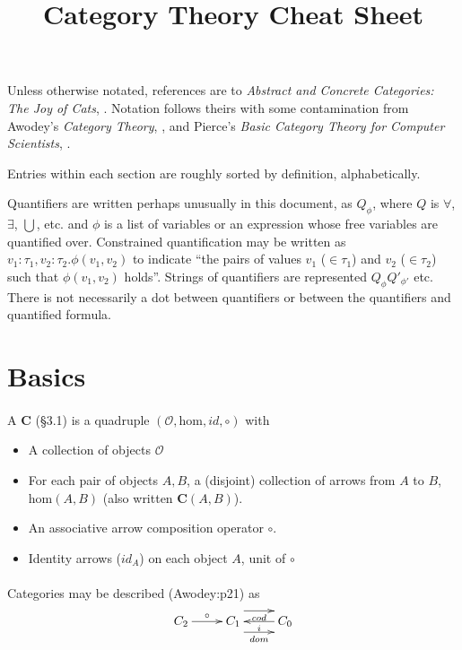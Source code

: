 \documentclass[10pt,twocolumn,letterpaper]{article}
\title{Category Theory Cheat Sheet}
\begin{document}
Unless otherwise notated, references are to \textit{Abstract and Concrete
Categories: The Joy of Cats}, \cite{adamek:joy}.  Notation follows theirs
with some contamination from Awodey's \textit{Category Theory},
\cite{awodey:ct}, and Pierce's \textit{Basic Category Theory for Computer
Scientists}, \cite{pierce:basicct}.

Entries within each section are roughly sorted by definition, alphabetically.

Quantifiers are written perhaps unusually in this document, as $Q_{\phi}$,
where $Q$ is $\forall$, $\exists$, $\bigcup$, etc. and $\phi$ is a list of
variables or an expression whose free variables are quantified over.
Constrained quantification may be written as $v_1 : \tau_1, v_2 : \tau_2 .
\phi(v_1,v_2)$ to indicate ``the pairs of values $v_1$ ($\in \tau_1$) and
$v_2$ ($\in \tau_2$) such that $\phi(v_1,v_2)$ holds''.  Strings of
quantifiers are represented $Q_{\phi} Q'_{\phi'}$ etc.  There is not
necessarily a dot between quantifiers or between the quantifiers and
quantified formula.

\section{Basics} %

  \paragraph{}
  A  $\mathbf{C}$ (\S3.1) is a quadruple
  $(\mathcal{O},\mbox{hom},id,\circ)$ with
  \begin{itemize}
    \item A collection of objects $\mathcal{O}$
  \item For each pair of objects $A,B$, a (disjoint) collection of arrows
    from  $A$ to  $B$,
    $\mbox{hom}(A,B)$ (also written $\mathbf{C}(A,B)$).
    \item An associative arrow composition operator $\circ$.
    \item Identity arrows ($id_A$) on each object $A$, unit of $\circ$
  \end{itemize}

  \paragraph{}
  Categories may be described (Awodey:p21) as
     \[\xymatrix{ C_2 \ar[r]^\circ & C_1 \ar@<2ex>[r]_{cod} \ar@<-2ex>[r]_{dom} & C_0 \ar[l]^i }\]
\end{document}
